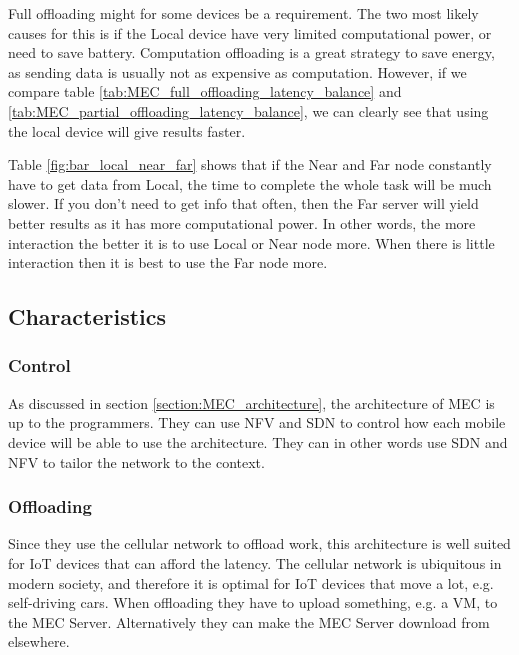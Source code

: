 Full offloading might for some devices be a requirement. The two most likely causes for this is if the Local device have very limited computational power, or need to save battery. Computation offloading is a great strategy to save energy, as sending data is usually not as expensive as computation. However, if we compare table \ref{tab:MEC_full_offloading_latency_balance} and \ref{tab:MEC_partial_offloading_latency_balance}, we can clearly see that using the local device will give results faster.

Table \ref{fig:bar_local_near_far} shows that if the Near and Far node constantly have to get data from Local, the time to complete the whole task will be much slower. If you don't need to get info that often, then the Far server will yield better results as it has more computational power. In other words, the more interaction the better it is to use Local or Near node more. When there is little interaction then it is best to use the Far node more.








\subsection{Characteristics}
\subsubsection{Control}
As discussed in section \ref{section:MEC_architecture}, the architecture of MEC is up to the programmers. They can use NFV and SDN to control how each mobile device will be able to use the architecture. They can in other words use SDN and NFV to tailor the network to the context.
\subsubsection{Offloading}
Since they use the cellular network to offload work, this architecture is well suited for IoT devices that can afford the latency. The cellular network is ubiquitous in modern society, and therefore it is optimal for IoT devices that move a lot, e.g. self-driving cars. When offloading they have to upload something, e.g. a VM, to the MEC Server. Alternatively they can make the MEC Server download from elsewhere.
